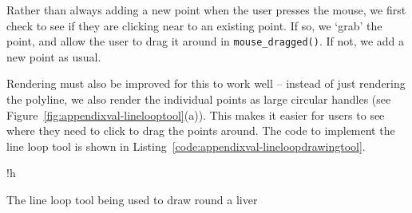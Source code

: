 Rather than always adding a new point when the user presses the mouse, we first check to see if they are clicking near to an existing point. If so, we `grab' the point, and allow the user to drag it around in \texttt{mouse_dragged()}. If not, we add a new point as usual.

Rendering must also be improved for this to work well -- instead of just rendering the polyline, we also render the individual points as large circular handles (see Figure~\ref{fig:appendixval-linelooptool}(a)). This makes it easier for users to see where they need to click to drag the points around. The code to implement the line loop tool is shown in Listing~\ref{code:appendixval-lineloopdrawingtool}.

\vspace{1cm}
\begin{stusubfig}{!h}
	\hspace{4mm}%
\caption{The line loop tool being used to draw round a liver}
\label{fig:appendixval-linelooptool}
\end{stusubfig}

